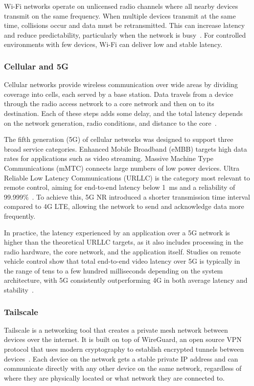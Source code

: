 Wi-Fi networks operate on unlicensed radio channels where all nearby devices transmit on the same frequency. When multiple devices transmit at the same time, collisions occur and data must be retransmitted. This can increase latency and reduce predictability, particularly when the network is busy~\cite{bankov2019}. For controlled environments with few devices, Wi-Fi can deliver low and stable latency.

\subsubsection{Cellular and 5G}\label{subsec:5g}
Cellular networks provide wireless communication over wide areas by dividing coverage into cells, each served by a base station. Data travels from a device through the radio access network to a core network and then on to its destination. Each of these steps adds some delay, and the total latency depends on the network generation, radio conditions, and distance to the core~\cite{li2018urllc}.
 
The fifth generation (5G) of cellular networks was designed to support three broad service categories. Enhanced Mobile Broadband (eMBB) targets high data rates for applications such as video streaming. Massive Machine Type Communications (mMTC) connects large numbers of low power devices. Ultra Reliable Low Latency Communications (URLLC) is the category most relevant to remote control, aiming for end-to-end latency below 1~ms and a reliability of 99.999\%~\cite{li2018urllc, schulz2017urllc}. To achieve this, 5G NR introduced a shorter transmission time interval compared to 4G LTE, allowing the network to send and acknowledge data more frequently.
 
In practice, the latency experienced by an application over a 5G network is higher than the theoretical URLLC targets, as it also includes processing in the radio hardware, the core network, and the application itself. Studies on remote vehicle control show that total end-to-end video latency over 5G is typically in the range of tens to a few hundred milliseconds depending on the system architecture, with 5G consistently outperforming 4G in both average latency and stability~\cite{ouden2022}.
 
\subsubsection{Tailscale}\label{subsec:tailscale}
Tailscale is a networking tool that creates a private mesh network between devices over the internet. It is built on top of WireGuard, an open source VPN protocol that uses modern cryptography to establish encrypted tunnels between devices~\cite{tailscale_what}. Each device on the network gets a stable private IP address and can communicate directly with any other device on the same network, regardless of where they are physically located or what network they are connected to.
 

